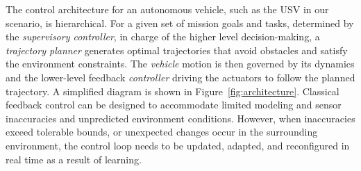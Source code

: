 


The control architecture for an autonomous vehicle, such as the USV in our scenario, is hierarchical. For a given set of mission goals and tasks, determined by the \emph{supervisory controller}, in charge of the higher level decision-making, a \emph{trajectory planner} generates optimal trajectories that avoid obstacles and satisfy the environment constraints. The \emph{vehicle} motion is then governed by its dynamics and the lower-level feedback \emph{controller} driving the actuators to follow the planned trajectory. A simplified diagram is shown in Figure~\ref{fig:architecture}. Classical feedback control can be designed to accommodate limited modeling and sensor inaccuracies and unpredicted environment conditions. However, when inaccuracies exceed tolerable bounds, or unexpected changes occur in the surrounding environment, the control loop needs to be updated, adapted, and reconfigured in real time as a result of learning. 
%
